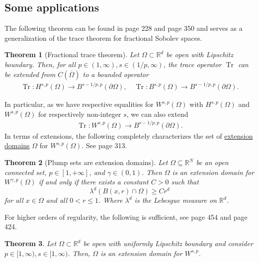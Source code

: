 \documentclass[
    a4paper,
    DIV=14,
    abstract=true,
    numbers=noenddot
]
{scrartcl}
\newtheorem{theorem}{Theorem}[section]
\theoremstyle{definition}
\newcommand{\R}{\mathbb{R}}
\begin{document}
\subsection{Some applications}
The following theorem can be found in \cite{agranovich2015sobolev} page 228 and \cite{leoni2023first} page 350 and serves as a generalization of the trace theorem for fractional Sobolev spaces.
\begin{theorem}[Fractional trace theorem]\label{trace theorem}
    Let $\Omega \subset \R^d$ be open with Lipschitz boundary. Then, for all  $p\in (1,\infty), s\in (1/p,\infty) $, the trace operator $\operatorname{Tr}$ can be extended from $C(\overline{\Omega } )$  to a bounded operator
    \begin{align*}
        \operatorname{Tr}: H^{s,p}(\Omega ) \to B^{s-1/p,p}(\partial\Omega), \quad \operatorname{Tr}: B^{s,p}(\Omega ) \to B^{s-1/p,p}(\partial\Omega).
    \end{align*}
\end{theorem}
In particular, as we have respective equalities for $W^{s,p}(\Omega )$ with $H^{s,p}(\Omega )$ and $W^{s,p}(\Omega )$ for respectively non-integer  $s$, we can also extend
\begin{align*}
    \operatorname{Tr}: W^{s,p}(\Omega ) \to B^{s-1/p,p}(\partial\Omega).
\end{align*}
In terms of extensions, the following completely characterizes the set of \href{https://nowheredifferentiable.com/2023-07-12-PDEs-3-Sobolev_spaces/#global:~:text=there%20exists%20a-,continuous,-operator}{extension domains} $\Omega $ for $W^{s,p}(\Omega )$. See \cite{leoni2017first} page 313.
\begin{theorem}[Plump sets are extension domains]\label{plump sets}
    Let $\Omega \subseteq \mathbb{R}^N$ be an open connected set, $p\in [1,+\infty]$, and $\gamma\in (0,1)$. Then $\Omega$ is an extension domain for $W^{\gamma, p}(\Omega)$ if and only if there exists a constant $C>0$ such that
    $$
        \lambda^d(B(x, r) \cap \Omega) \geq C r^d
    $$
    for all $x \in \Omega$ and all $0<r \leq 1$. Where $\lambda^d$ is the Lebesgue measure on $\R^d$.
\end{theorem}
For higher orders of regularity, the following is sufficient, see \cite{leoni2023first} page 454 and \cite{leoni2017first} page 424.
\begin{theorem}
    Let $\Omega \subset \R^d$ be open with uniformly Lipschitz boundary and consider   $p\in [1,\infty), s\in[1,\infty)$. Then, $\Omega $ is an extension domain for $W^{s,p}$.
\end{theorem}
\end{document}
